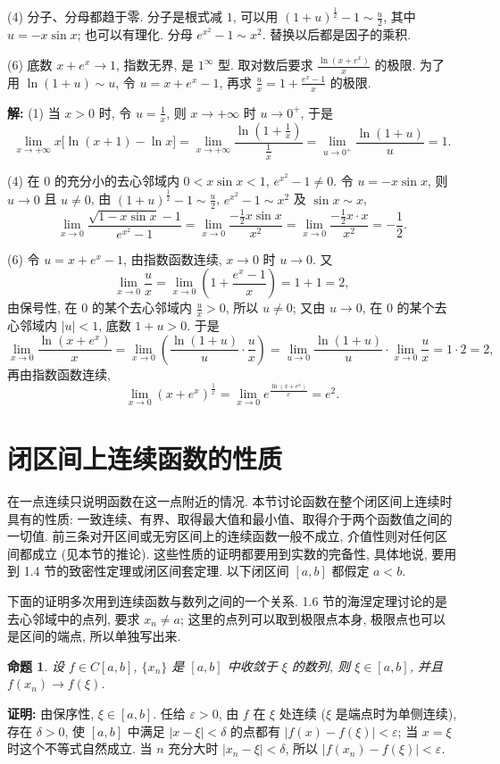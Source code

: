 \documentclass[UTF8,openany]{ctexbook}
\theoremstyle{chinesetextbook}
\newenvironment{cnproof}{\par\indent\textbf{证明:} \ignorespaces}{\par}
\newenvironment{cnsolution}{\par\indent\textbf{解:} \ignorespaces}{\par}
\newtheorem*{propositionsingle}{命题}
\begin{document}
(4) 分子、分母都趋于零. 分子是根式减 $1$, 可以用 $\displaystyle(1+u)^{\frac12}-1\sim\frac u2$, 其中 $u=-x\sin x$; 也可以有理化. 分母 $e^{x^2}-1\sim x^2$. 替换以后都是因子的乘积.

(6) 底数 $x+e^x\to1$, 指数无界, 是 $1^\infty$ 型. 取对数后要求 $\displaystyle\frac{\ln(x+e^x)}x$ 的极限. 为了用 $\ln(1+u)\sim u$, 令 $u=x+e^x-1$, 再求 $\displaystyle\frac ux=1+\frac{e^x-1}x$ 的极限.
\begin{cnsolution}
(1) 当 $x>0$ 时, 令 $\displaystyle u=\frac1x$, 则 $x\to+\infty$ 时 $u\to0^+$, 于是
\[
\lim_{x\to+\infty}x\bigl[\ln(x+1)-\ln x\bigr]=\lim_{x\to+\infty}\frac{\ln\left(1+\frac1x\right)}{\frac1x}=\lim_{u\to0^+}\frac{\ln(1+u)}u=1.
\]

(4) 在 $0$ 的充分小的去心邻域内 $0<x\sin x<1$, $e^{x^2}-1\ne0$. 令 $u=-x\sin x$, 则 $u\to0$ 且 $u\ne0$, 由 $\displaystyle(1+u)^{\frac12}-1\sim\frac u2$, $e^{x^2}-1\sim x^2$ 及 $\sin x\sim x$,
\[
\lim_{x\to0}\frac{\sqrt{1-x\sin x}-1}{e^{x^2}-1}=\lim_{x\to0}\frac{-\frac12x\sin x}{x^2}=\lim_{x\to0}\frac{-\frac12x\cdot x}{x^2}=-\frac12.
\]

(6) 令 $u=x+e^x-1$, 由指数函数连续, $x\to0$ 时 $u\to0$. 又
\[
\lim_{x\to0}\frac ux=\lim_{x\to0}\left(1+\frac{e^x-1}x\right)=1+1=2,
\]
由保号性, 在 $0$ 的某个去心邻域内 $\displaystyle\frac ux>0$, 所以 $u\ne0$; 又由 $u\to0$, 在 $0$ 的某个去心邻域内 $|u|<1$, 底数 $1+u>0$. 于是
\[
\lim_{x\to0}\frac{\ln(x+e^x)}x=\lim_{x\to0}\left(\frac{\ln(1+u)}u\cdot\frac ux\right)=\lim_{u\to0}\frac{\ln(1+u)}u\cdot\lim_{x\to0}\frac ux=1\cdot2=2,
\]
再由指数函数连续,
\[
\lim_{x\to0}\left(x+e^x\right)^{\frac1x}=\lim_{x\to0}e^{\frac{\ln(x+e^x)}x}=e^2.
\]
\end{cnsolution}
\section{闭区间上连续函数的性质}
在一点连续只说明函数在这一点附近的情况. 本节讨论函数在整个闭区间上连续时具有的性质: 一致连续、有界、取得最大值和最小值、取得介于两个函数值之间的一切值. 前三条对开区间或无穷区间上的连续函数一般不成立, 介值性则对任何区间都成立 (见本节的推论). 这些性质的证明都要用到实数的完备性, 具体地说, 要用到 1.4 节的致密性定理或闭区间套定理. 以下闭区间 $[a,b]$ 都假定 $a<b$.

下面的证明多次用到连续函数与数列之间的一个关系. 1.6 节的海涅定理讨论的是去心邻域中的点列, 要求 $x_n\ne a$; 这里的点列可以取到极限点本身, 极限点也可以是区间的端点, 所以单独写出来.
\begin{propositionsingle}
设 $f\in C[a,b]$, $\{x_n\}$ 是 $[a,b]$ 中收敛于 $\xi$ 的数列, 则 $\xi\in[a,b]$, 并且 $f(x_n)\to f(\xi)$.
\end{propositionsingle}
\begin{cnproof}
由保序性, $\xi\in[a,b]$. 任给 $\varepsilon>0$, 由 $f$ 在 $\xi$ 处连续 ($\xi$ 是端点时为单侧连续), 存在 $\delta>0$, 使 $[a,b]$ 中满足 $|x-\xi|<\delta$ 的点都有 $|f(x)-f(\xi)|<\varepsilon$; 当 $x=\xi$ 时这个不等式自然成立. 当 $n$ 充分大时 $|x_n-\xi|<\delta$, 所以 $|f(x_n)-f(\xi)|<\varepsilon$.
\end{cnproof}
\end{document}

